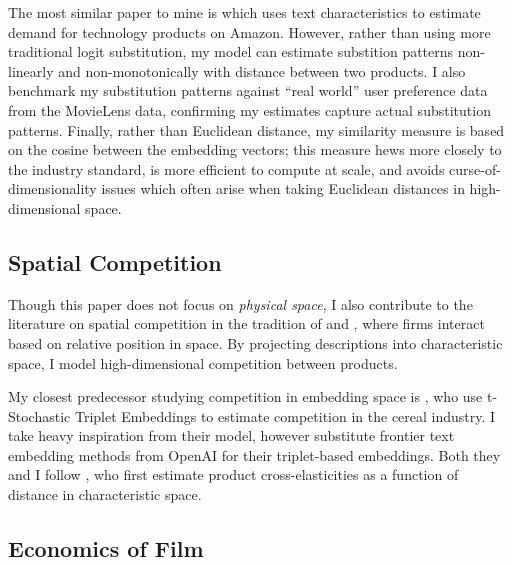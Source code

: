 \documentclass{article}
\begin{document}

The most similar paper to mine is \textcite{compiani2023} which uses text characteristics to estimate demand for technology products on Amazon. However, rather than using more traditional logit substitution, my model can estimate substition patterns non-linearly and non-monotonically with distance between two products. I also benchmark my substitution patterns against ``real world'' user preference data from the MovieLens data, confirming my estimates capture actual substitution patterns. Finally, rather than Euclidean distance, my similarity measure is based on the cosine between the embedding vectors; this measure hews more closely to the industry standard, is more efficient to compute at scale, and avoids curse-of-dimensionality issues which often arise when taking Euclidean distances in high-dimensional space. 

\subsection{Spatial Competition}

Though this paper does not focus on \emph{physical space}, I also contribute to the literature on spatial competition in the tradition of \textcite{hotelling1929E} and \textcite{salop1979BE}, where firms interact based on relative position in space. By projecting descriptions into characteristic space, I model high-dimensional competition between products. 

My closest predecessor studying competition in embedding space is \textcite{magnolfi2022}, who use t-Stochastic Triplet Embeddings to estimate competition in the cereal industry. I take heavy inspiration from their model, however substitute frontier text embedding methods from OpenAI for their triplet-based embeddings. Both they and I follow \textcite{pinkse2002E}, who first estimate product cross-elasticities as a function of distance in characteristic space.

\subsection{Economics of Film}
\end{document}
